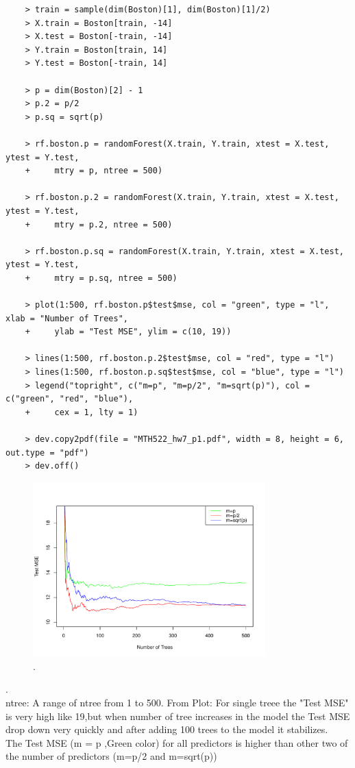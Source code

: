 \documentclass{article}
\begin{document}
\begin{program}
	\begin{verbatim}
	> train = sample(dim(Boston)[1], dim(Boston)[1]/2)
	> X.train = Boston[train, -14]
	> X.test = Boston[-train, -14]
	> Y.train = Boston[train, 14]
	> Y.test = Boston[-train, 14]
	
	> p = dim(Boston)[2] - 1
	> p.2 = p/2
	> p.sq = sqrt(p)
	
	> rf.boston.p = randomForest(X.train, Y.train, xtest = X.test, ytest = Y.test,
	+     mtry = p, ntree = 500)
	
	> rf.boston.p.2 = randomForest(X.train, Y.train, xtest = X.test, ytest = Y.test,
	+     mtry = p.2, ntree = 500)
	
	> rf.boston.p.sq = randomForest(X.train, Y.train, xtest = X.test, ytest = Y.test,
	+     mtry = p.sq, ntree = 500)
	
	> plot(1:500, rf.boston.p$test$mse, col = "green", type = "l", xlab = "Number of Trees",
	+     ylab = "Test MSE", ylim = c(10, 19))
	
	> lines(1:500, rf.boston.p.2$test$mse, col = "red", type = "l")
	> lines(1:500, rf.boston.p.sq$test$mse, col = "blue", type = "l")
	> legend("topright", c("m=p", "m=p/2", "m=sqrt(p)"), col = c("green", "red", "blue"),
	+     cex = 1, lty = 1)
	
	> dev.copy2pdf(file = "MTH522_hw7_p1.pdf", width = 8, height = 6, out.type = "pdf")
	> dev.off()
	\end{verbatim}
\end{program}


\newpage

\begin{figure}[htb]
	\begin{center}
		\includegraphics[width=0.8\textwidth]{MTH522_hw7_p1.pdf}
	\end{center}
	\caption{.}
	\label{fig:MTH522_hw7_p1}
\end{figure}
.\\
ntree: A range of ntree from 1 to 500.
From Plot: For single treee the "Test MSE" is very high like 19,but when number of tree increases  in the model the Test MSE drop down very quickly and after adding 100 trees to the model it stabilizes. \\
The Test MSE (m = p ,Green color) for all predictors is higher than other two of the number of predictors (m=p/2 and m=sqrt(p))
\end{document}
